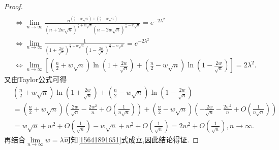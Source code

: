 \documentclass[../../main.tex]{subfiles}
\begin{document}
\begin{proof}
\begin{align}
\nonumber
\\
&\Leftrightarrow \lim_{n\rightarrow \infty} \frac{n^{\left( \frac{n}{2}+w\sqrt{n} \right) +\left( \frac{n}{2}-w\sqrt{n} \right)}}{(n+2w\sqrt{n})^{\frac{n}{2}+w\sqrt{n}}(n-2w\sqrt{n})^{\frac{n}{2}-w\sqrt{n}}}=e^{-2\lambda ^2}
\nonumber
\\
&\Leftrightarrow \lim_{n\rightarrow \infty} \frac{1}{\left( 1+\frac{2w}{\sqrt{n}} \right) ^{\frac{n}{2}+w\sqrt{n}}\left( 1-\frac{2w}{\sqrt{n}} \right) ^{\frac{n}{2}-w\sqrt{n}}}=e^{-2\lambda ^2}
\nonumber
\\
&\Leftrightarrow \lim_{n\rightarrow \infty} \left[ \left( \frac{n}{2}+w\sqrt{n} \right) \ln \left( 1+\frac{2w}{\sqrt{n}} \right) +\left( \frac{n}{2}-w\sqrt{n} \right) \ln \left( 1-\frac{2w}{\sqrt{n}} \right) \right] =2\lambda ^2.\label{15641891651}
\end{align}
又由Taylor公式可得
\begin{align*}
&\left( \frac{n}{2}+w\sqrt{n} \right) \ln \left( 1+\frac{2w}{\sqrt{n}} \right) +\left( \frac{n}{2}-w\sqrt{n} \right) \ln \left( 1-\frac{2w}{\sqrt{n}} \right) 
\\
&=\left( \frac{n}{2}+w\sqrt{n} \right) \left( \frac{2w}{\sqrt{n}}-\frac{2w^2}{n}+O\left( \frac{1}{n\sqrt{n}} \right) \right) +\left( \frac{n}{2}-w\sqrt{n} \right) \left( -\frac{2w}{\sqrt{n}}-\frac{2w^2}{n}+O\left( \frac{1}{n\sqrt{n}} \right) \right) 
\\
&=w\sqrt{n}+w^2+O\left( \frac{1}{\sqrt{n}} \right) -w\sqrt{n}+w^2+O\left( \frac{1}{\sqrt{n}} \right) =2w^2+O\left( \frac{1}{\sqrt{n}} \right) ,n\to \infty.
\end{align*}
再结合$\underset{n\rightarrow \infty}{\lim}w=\lambda$可知\eqref{15641891651}式成立,因此结论得证.
\end{proof}
\end{document}
